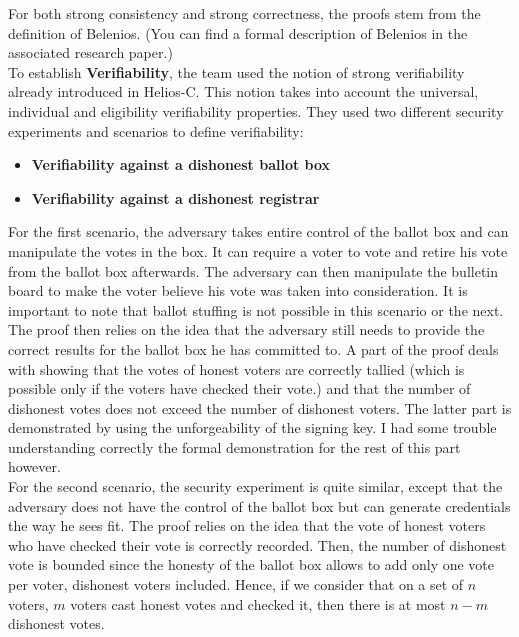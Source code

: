 \documentclass[12pt, a4paper]{report}
\begin{document}
For both strong consistency and strong correctness, the proofs stem from the definition of Belenios. (You can find a formal description of Belenios in the associated research paper.) \cite{BOOK:2} \\

To establish \textbf{Verifiability}, the team used the notion of strong verifiability already introduced in Helios-C. This notion takes into account the universal, individual and eligibility verifiability properties. They used two different security experiments and scenarios to define verifiability:

\begin{itemize}
\item \textbf{Verifiability against a dishonest ballot box}
\item \textbf{Verifiability against a dishonest registrar}
\end{itemize} 

For the first scenario, the adversary takes entire control of the ballot box and can manipulate the votes in the box. It can require a voter to vote and retire his vote from the ballot box afterwards. The adversary can then manipulate the bulletin board to make the voter believe his vote was taken into consideration. It is important to note that ballot stuffing is not possible in this scenario or the next. The proof then relies on the idea that the adversary still needs to provide the correct results for the ballot box he has committed to. A part of the proof deals with showing that the votes of honest voters are correctly tallied (which is possible only if the voters have checked their vote.) and that the number of dishonest votes does not exceed the number of dishonest voters. The latter part is demonstrated by using the unforgeability of the signing key. I had some trouble understanding correctly the formal demonstration for the rest of this part however.\cite{BOOK:2} \\

For the second scenario, the security experiment is quite similar, except that the adversary does not have the control of the ballot box but can generate credentials the way he sees fit. The proof relies on the idea that the vote of honest voters who have checked their vote is correctly recorded. Then, the number of dishonest vote is bounded since the honesty of the ballot box allows to add only one vote per voter, dishonest voters included. Hence, if we consider that on a set of $n$ voters, $m$ voters cast honest votes and checked it, then there is at most $n - m$ dishonest votes. \cite{BOOK:2}
  
\end{document}
